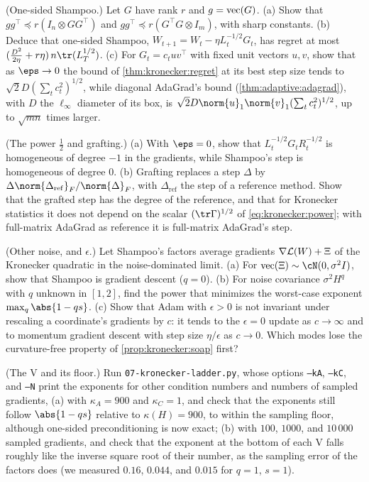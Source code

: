 \begin{refsection}
\begin{exercises}
\item \variation (One-sided Shampoo.) Let $G$ have rank $r$ and $g=\operatorname{vec}(G)$. (a) Show that $gg^\top\preceq r(I_n\otimes GG^\top)$ and $gg^\top\preceq r(G^\top G\otimes I_m)$, with sharp constants.  (b) Deduce that one-sided Shampoo, $W_{t+1}=W_t-\eta L_t^{-1/2}G_t$, has regret at most $(\frac{D^2}{2\eta}+r\eta)\,n\tr(L_T^{1/2})$. (c) For $G_t=c_tuv^\top$ with fixed unit vectors $u,v$, show that as $\eps\to0$ the bound of \cref{thm:kronecker:regret} at its best step size tends to $\sqrt2D(\sum_tc_t^2)^{1/2}$, while diagonal AdaGrad's bound (\cref{thm:adaptive:adagrad}), with $D$ the $\ell_\infty$ diameter of its box, is $\sqrt2D\norm{u}_1\norm{v}_1(\sum_tc_t^2)^{1/2}$, up to $\sqrt{mn}$ times larger.\label{ex:kronecker:onesided}

\item \variation (The power $\frac12$ and grafting.) (a) With $\eps=0$, show that $L_t^{-1/2}G_tR_t^{-1/2}$ is homogeneous of degree $-1$ in the gradients, while Shampoo's step is homogeneous of degree $0$. (b) Grafting replaces a step $\Delta$ by $\Delta\norm{\Delta_{\mathrm{ref}}}_F/\norm{\Delta}_F$, with $\Delta_{\mathrm{ref}}$ the step of a reference method. Show that the grafted step has the degree of the reference, and that for Kronecker statistics it does not depend on the scalar $(\tr\Gamma)^{1/2}$ of \eqref{eq:kronecker:power}; with full-matrix AdaGrad as reference it is full-matrix AdaGrad's step.\label{ex:kronecker:graft}

\item \variation (Other noise, and $\epsilon$.) Let Shampoo's factors average gradients $\nabla\mathcal{L}(W)+\Xi$ of the Kronecker quadratic in the noise-dominated limit. (a) For $\vect(\Xi)\sim\cN(0,\sigma^2I)$, show that Shampoo is gradient descent ($q=0$). (b) For noise covariance $\sigma^2H^q$ with $q$ unknown in $[1,2]$, find the power that minimizes the worst-case exponent $\max_q\abs{1-qs}$. (c) Show that Adam with $\epsilon>0$ is not invariant under rescaling a coordinate's gradients by $c$: it tends to the $\epsilon=0$ update as $c\to\infty$ and to momentum gradient descent with step size $\eta/\epsilon$ as $c\to0$. Which modes lose the curvature-free property of \cref{prop:kronecker:soap} first? \label{ex:kronecker:noise}

\item \simulation (The V and its floor.) Run \texttt{07-kronecker-ladder.py}, whose options \texttt{--kA}, \texttt{--kC}, and \texttt{--N} print the exponents for other condition numbers and numbers of sampled gradients, (a) with $\kappa_A=900$ and $\kappa_C=1$, and check that the exponents still follow $\abs{1-qs}$ relative to $\kappa(H)=900$, to within the sampling floor, although one-sided preconditioning is now exact; (b) with $100$, $1000$, and $10\,000$ sampled gradients, and check that the exponent at the bottom of each V falls roughly like the inverse square root of their number, as the sampling error of the factors does (we measured $0.16$, $0.044$, and $0.015$ for $q=1$, $s=1$).\label{ex:kronecker:simV}


\end{exercises}
\end{refsection}
